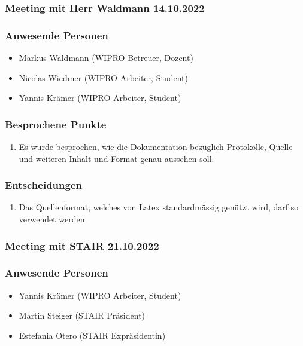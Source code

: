 \documentclass[a4paper, table]{article}
\begin{document}
\newpage
\subsubsection{Meeting mit Herr Waldmann 14.10.2022}

\subsubsection*{Anwesende Personen}

\begin{itemize}
    \item Markus Waldmann (WIPRO Betreuer, Dozent)
    \item Nicolas Wiedmer (WIPRO Arbeiter, Student)
    \item Yannis Krämer (WIPRO Arbeiter, Student)
\end{itemize}

\subsubsection*{Besprochene Punkte}

\begin{enumerate}
    \item Es wurde besprochen, wie die Dokumentation bezüglich Protokolle, Quelle und weiteren Inhalt und Format genau aussehen soll.
\end{enumerate}

\subsubsection*{Entscheidungen}

\begin{enumerate}
    \item Das Quellenformat, welches von Latex standardmässig genützt wird, darf so verwendet werden.
\end{enumerate}

\newpage
\subsubsection{Meeting mit STAIR 21.10.2022}

\subsubsection*{Anwesende Personen}

\begin{itemize}
    \item Yannis Krämer (WIPRO Arbeiter, Student)
    \item Martin Steiger (STAIR Präsident)
    \item Estefania Otero (STAIR Expräsidentin)
\end{itemize}
\end{document}
